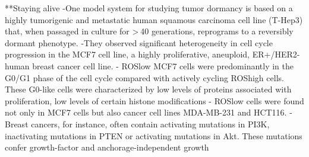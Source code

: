 \documentclass[11pt,a4paper]{article}
\begin{document}
**Staying alive
-One model system for studying tumor dormancy is based on a highly tumorigenic and metastatic human squamous carcinoma cell line (T-Hep3) that, when passaged in culture for > 40 generations, reprograms to a reversibly dormant phenotype.
-They observed significant heterogeneity in cell cycle progression in the MCF7 cell line, a highly proliferative, aneuploid, ER+/HER2- human breast cancer cell line.
- ROSlow MCF7 cells were predominantly in the G0/G1 phase of the cell cycle compared with actively cycling ROShigh cells. These G0-like cells were characterized by low levels of proteins associated with proliferation, low levels of certain histone modifications
- ROSlow cells were found not only in MCF7 cells but also cancer cell lines MDA-MB-231 and HCT116.
-Breast cancers, for instance, often contain activating mutations in PI3K, inactivating mutations in PTEN or activating mutations in Akt. These mutations confer growth-factor and anchorage-independent growth
\end{document}
